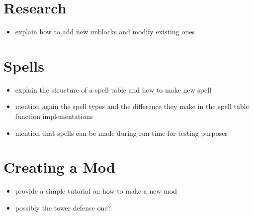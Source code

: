 \section{Research}

\begin{itemize}
    \item explain how to add new unblocks and modify existing ones
\end{itemize}

\section{Spells}

\begin{itemize}
    \item explain the structure of a spell table and how to make new spell
    \item mention again the spell types and the difference they make
        in the spell table function implementations
    \item mention that spells can be made during run time for testing
        purposes
\end{itemize}

\section{Creating a Mod}

\begin{itemize}
    \item provide a simple tutorial on how to make a new mod
    \item possibly the tower defense one?
\end{itemize}
